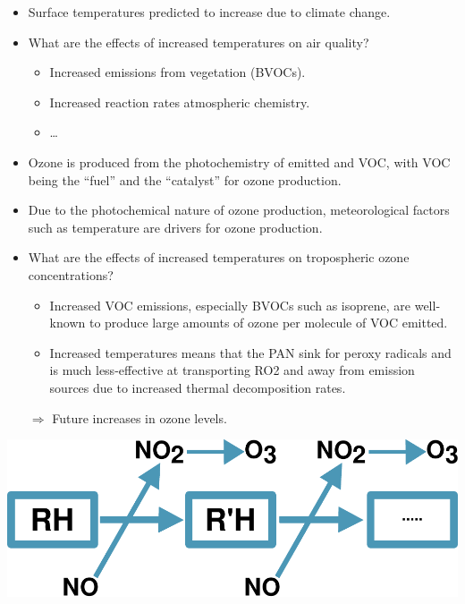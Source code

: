 \begin{BlueBox}
    \vskip-1cm
    \begin{block}{}
        \begin{itemize}
            \item Surface temperatures predicted to increase due to climate change.
            \item What are the effects of increased temperatures on air quality?
                \begin{itemize}
                    \item Increased emissions from vegetation (BVOCs).
                    \item Increased reaction rates atmospheric chemistry.
                    \item \ldots
                \end{itemize}
            \vspace{8mm}
            \item Ozone is produced from the photochemistry of emitted  and VOC, with VOC being the ``fuel'' and  the ``catalyst'' for ozone production.
            \item Due to the photochemical nature of ozone production, meteorological factors such as temperature are drivers for ozone production.
            \item What are the effects of increased temperatures on tropospheric ozone concentrations?
                \begin{itemize}
                    \item Increased VOC emissions, especially BVOCs such as isoprene, are well-known to produce large amounts of ozone per molecule of VOC emitted.
                    \item Increased temperatures means that the PAN sink for peroxy radicals and  is much less-effective at transporting RO2 and  away from emission sources due to increased thermal decomposition rates.  
                \end{itemize}
            $\Rightarrow$ Future increases in ozone levels.
        \end{itemize}
        \includegraphics[width=\textwidth]{VOC_Oxidation}
    \end{block}
\end{BlueBox}
